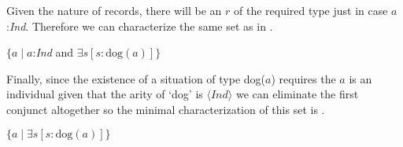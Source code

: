 Given the nature of records, there will be an $r$ of the required type
just in case $a$:\textit{Ind}.  Therefore we can characterize the same set
as in \nexteg{}.
\begin{ex} 
$\{a\mid a$:\textit{Ind} and 
$\exists s [s:\text{dog}(a)]\}$ 
\end{ex} 
Finally, since the existence of a situation of type dog($a$) requires
the $a$ is an individual given that the arity of `dog' is
$\langle\textit{Ind}\rangle$ we can eliminate the first conjunct
altogether so the minimal characterization of this set is \nexteg{}.
\begin{ex} 
$\{a\mid  
\exists s [s:\text{dog}(a)]\}$  
\end{ex} 
       
   
   
  

